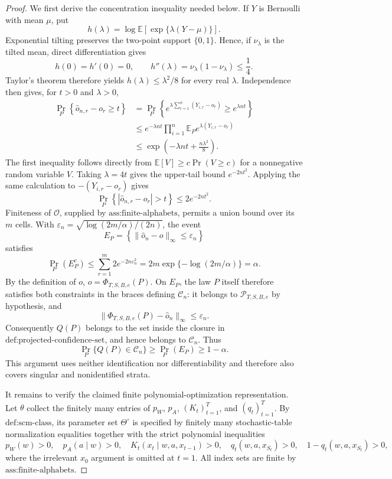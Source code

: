 \documentclass{article}
\begin{document}
\begin{proof}
We first derive the concentration inequality needed below.  If \(Y\) is Bernoulli with mean \(\mu\), put
\[
h(\lambda)=\log\mathbb E\!\left[\exp\{\lambda(Y-\mu)\}\right].
\]
Exponential tilting preserves the two-point support \(\{0,1\}\).  Hence, if \(\nu_\lambda\) is the tilted mean, direct differentiation gives
\[
h(0)=h'(0)=0,
\qquad
h''(\lambda)=\nu_\lambda(1-\nu_\lambda)\leq\frac14.
\]
Taylor's theorem therefore yields \(h(\lambda)\leq\lambda^2/8\) for every real \(\lambda\).  Independence then gives, for \(t>0\) and \(\lambda>0\),
\[
\begin{aligned}
\Pr_P\!\left\{\widehat o_{n,r}-o_r\geq t\right\}
&=\Pr_P\!\left\{e^{\lambda\sum_{i=1}^n(Y_{i,r}-o_r)}\geq e^{\lambda nt}\right\}\\
&\leq e^{-\lambda nt}\prod_{i=1}^n
  \mathbb E_P e^{\lambda(Y_{i,r}-o_r)}\\
&\leq \exp\!\left(-\lambda nt+\frac{n\lambda^2}{8}\right).
\end{aligned}
\]
The first inequality follows directly from
\(\mathbb E[V]\geq c\Pr(V\geq c)\) for a nonnegative random variable \(V\).  Taking \(\lambda=4t\) gives the upper-tail bound \(e^{-2nt^2}\).  Applying the same calculation to \(-(Y_{i,r}-o_r)\) gives
\[
\Pr_P\!\left\{|\widehat o_{n,r}-o_r|>t\right\}
\leq 2e^{-2nt^2}.
\]
Finiteness of \(\mathcal O\), supplied by \(\text{ass:finite-alphabets}\), permits a union bound over its \(m\) cells.  With \(\varepsilon_n=\sqrt{\log(2m/\alpha)/(2n)}\), the event
\[
E_P=\left\{\|\widehat o_n-o\|_\infty\leq\varepsilon_n\right\}
\]
satisfies
\[
\Pr_P(E_P^c)
\leq\sum_{r=1}^m2e^{-2n\varepsilon_n^2}
=2m\exp\{-\log(2m/\alpha)\}
=\alpha.
\]
By the definition of \(o\), \(o=\Phi_{T,S,B,e}(P)\).  On \(E_P\), the law \(P\) itself therefore satisfies both constraints in the braces defining \(\mathcal C_n\): it belongs to \(\mathcal P_{T,S,B,e}\) by hypothesis, and
\[
\|\Phi_{T,S,B,e}(P)-\widehat o_n\|_\infty\leq\varepsilon_n.
\]
Consequently \(Q(P)\) belongs to the set inside the closure in \(\text{def:projected-confidence-set}\), and hence belongs to \(\mathcal C_n\).  Thus
\[
\Pr_P\{Q(P)\in\mathcal C_n\}
\geq\Pr_P(E_P)
\geq1-\alpha.
\]
This argument uses neither identification nor differentiability and therefore also covers singular and nonidentified strata.

It remains to verify the claimed finite polynomial-optimization representation.  Let \(\theta\) collect the finitely many entries of \(p_W\), \(p_A\), \((K_t)_{t=1}^T\), and \((q_t)_{t=1}^T\).  By \(\text{def:scm-class}\), its parameter set \(\Theta^\circ\) is specified by finitely many stochastic-table normalization equalities together with the strict polynomial inequalities
\[
p_W(w)>0,\quad p_A(a\mid w)>0,\quad K_t(x_t\mid w,a,x_{t-1})>0,
\quad q_t(w,a,x_{S_t})>0,
\quad 1-q_t(w,a,x_{S_t})>0,
\]
where the irrelevant \(x_0\) argument is omitted at \(t=1\).  All index sets are finite by \(\text{ass:finite-alphabets}\).


\end{proof}
\end{document}
